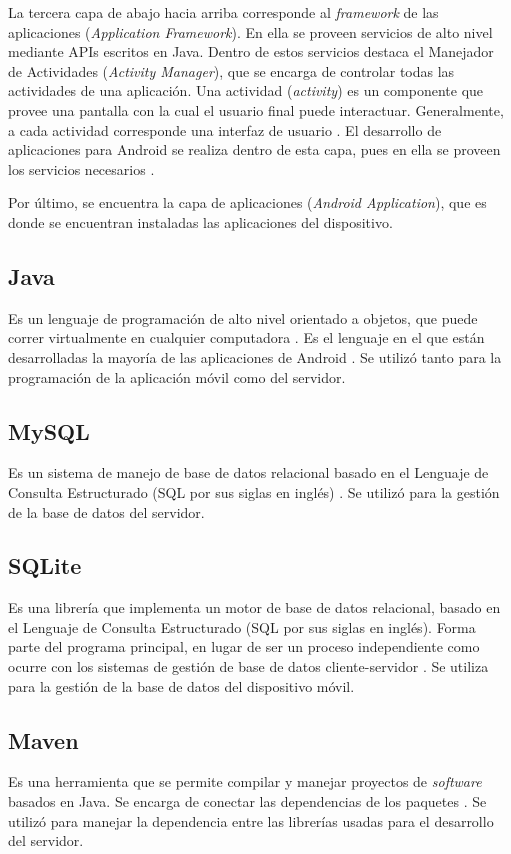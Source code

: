 La tercera capa de abajo hacia arriba corresponde al \textit{framework} de las aplicaciones (\textit{Application Framework}). En ella se proveen servicios de alto nivel mediante APIs escritos en Java. Dentro de estos servicios destaca el Manejador de Actividades (\textit{Activity Manager}), que se encarga de controlar todas las actividades de una aplicación\cite{AND3}. Una actividad (\textit{activity}) es un componente que provee una pantalla con la cual el usuario final puede interactuar. Generalmente, a cada actividad corresponde una interfaz de usuario \cite{AND6}. El desarrollo de aplicaciones para Android se realiza dentro de esta capa, pues en ella se proveen los servicios necesarios \cite{AND5}.

Por último, se encuentra la capa de aplicaciones (\textit{Android Application}), que es donde se encuentran instaladas las aplicaciones del dispositivo\cite{AND3}.

\subsection{Java}
Es un lenguaje de programación de alto nivel orientado a objetos, que puede correr virtualmente en cualquier computadora \cite{JAV1}. Es el lenguaje en el que están desarrolladas la mayoría de las aplicaciones de Android \cite{AND2}. Se utilizó tanto para la programación de la aplicación móvil como del servidor.

\subsection{MySQL} 
Es un sistema de manejo de base de datos relacional basado en el Lenguaje de Consulta Estructurado (SQL por sus siglas en inglés) \cite{SQL1}. Se utilizó para la gestión de la base de datos del servidor.

\subsection{SQLite}
Es una librería que implementa un motor de base de datos relacional, basado en el Lenguaje de Consulta Estructurado (SQL por sus siglas en inglés). Forma parte del programa principal, en lugar de ser un proceso independiente como ocurre con los sistemas de gestión de base de datos cliente-servidor \cite{SQL2}. Se utiliza para la gestión de la base de datos del dispositivo móvil.

\subsection{Maven}
Es una herramienta que se permite compilar y  manejar proyectos de \textit{software} basados en Java. Se encarga de conectar las dependencias de los paquetes \cite{MVN1}. Se utilizó para manejar la dependencia entre las librerías usadas para el desarrollo del servidor.

